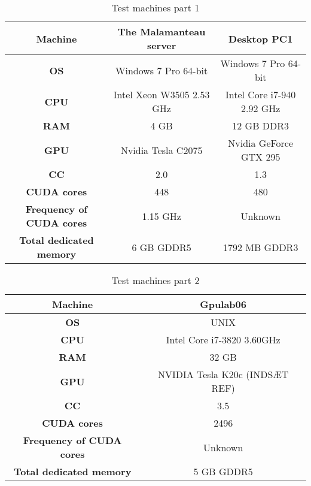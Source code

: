 \begin{table}
\begin{center}
\begin{tabular}{|c|c|c|}
	\hline
	\multicolumn{1}{|m{2.8cm}|}{\centering \textbf{Machine}} & The Malamanteau server & Desktop PC1 \\ \hline
	\multicolumn{1}{|m{2.8cm}|}{\centering \textbf{OS}} & Windows 7 Pro 64-bit & Windows 7 Pro 64-bit\\ \hline
	\multicolumn{1}{|m{2.8cm}|}{\centering \textbf{CPU}} & Intel Xeon W3505 2.53 GHz & Intel Core i7-940 2.92 GHz \\ \hline
	\multicolumn{1}{|m{2.8cm}|}{\centering \textbf{RAM}} & 4 GB & 12 GB DDR3\\ \hline
	\multicolumn{1}{|m{2.8cm}|}{\centering \textbf{GPU}} & Nvidia Tesla C2075 \cite{tesl} & Nvidia GeForce GTX 295 \cite{gtxx}\\ \hline
	\multicolumn{1}{|m{2.8cm}|}{\centering \textbf{CC}} & 2.0 & 1.3\\ \hline
	\multicolumn{1}{|m{2.8cm}|}{\centering \textbf{CUDA cores}} & 448 & 480\\ \hline
	\multicolumn{1}{|m{2.8cm}|}{\centering \textbf{Frequency of CUDA cores}} & 1.15 GHz & Unknown\\ \hline
	\multicolumn{1}{|m{2.8cm}|}{\centering \textbf{Total dedicated memory}} & 6 GB GDDR5 & 1792 MB GDDR3\\ \hline
\end{tabular}
\end{center}
\caption{Test machines part 1}
\label{table:machinesone}
\end{table}

\begin{table}
\begin{center}
\begin{tabular}{|c|c|}
	\hline
	\multicolumn{1}{|m{2.8cm}|}{\centering \textbf{Machine}} & Gpulab06 \\ \hline
	\multicolumn{1}{|m{2.8cm}|}{\centering \textbf{OS}} & UNIX \\ \hline
	\multicolumn{1}{|m{2.8cm}|}{\centering \textbf{CPU}} & Intel Core i7-3820 3.60GHz \\ \hline
	\multicolumn{1}{|m{2.8cm}|}{\centering \textbf{RAM}} & 32 GB \\ \hline
	\multicolumn{1}{|m{2.8cm}|}{\centering \textbf{GPU}} & NVIDIA Tesla K20c (INDSÆT REF) \\ \hline
	\multicolumn{1}{|m{2.8cm}|}{\centering \textbf{CC}} & 3.5 \\ \hline
	\multicolumn{1}{|m{2.8cm}|}{\centering \textbf{CUDA cores}} & 2496 \\ \hline
	\multicolumn{1}{|m{2.8cm}|}{\centering \textbf{Frequency of CUDA cores}} & Unknown \\ \hline
	\multicolumn{1}{|m{2.8cm}|}{\centering \textbf{Total dedicated memory}} & 5 GB GDDR5 \\ \hline
\end{tabular}
\end{center}
\caption{Test machines part 2}
\label{table:machinestwo}
\end{table}

